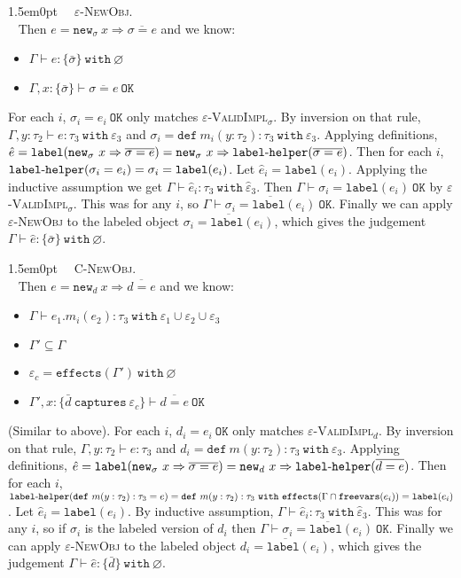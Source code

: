 \documentclass{llncs}
\newcommand{\keywadj}[1]{\mathtt{#1}}
\newcommand{\keyw}[1]{\keywadj{#1}~}
\newcommand{\hyphen}{\hbox{-}}
\newcommand{\proofcase}[2]{
	\begin{adjustwidth}{1.5em}{0pt}
		\fbox{Case.}~~#1. \\ ~#2
	\end{adjustwidth}
}
\newcommand{\type}[2]{
	#1~\keyw{with} #2
}
\newcommand{\newd}[0]{
	\keywadj{new}_d~x \Rightarrow \overline{d = e}
}
\newcommand{\newsig}[0]{
	\keywadj{new}_\sigma~x \Rightarrow \overline{\sigma = e}
}
\begin{document}
{\proofcase{\textsc{$\varepsilon$-NewObj}}{
Then $e = \newsig$ and we know:
\begin{itemize}
	\item $\Gamma \vdash e : \type{ \{ \bar \sigma \} }{\varnothing}$
	\item $\Gamma, x : \{ \bar \sigma \} \vdash \overline{ \sigma = e }~\keyw{OK}$
\end{itemize}
For each $i$, $\sigma_i = e_i~\keywadj{OK}$ only matches \textsc{$\varepsilon$-ValidImpl$_\sigma$}. By inversion on that rule, $\Gamma, y : \tau_2 \vdash e: \tau_3~\keyw{with} \varepsilon_3$ and $\sigma_i = \keyw{def} m_i(y : \tau_2) : \tau_3~\keyw{with} \varepsilon_3$. Applying definitions, $\hat e = \keywadj{label}(\newsig) = \keywadj{new}_\sigma~x \Rightarrow \keywadj{label \hyphen helper}(\overline{\sigma = e})$. Then for each $i$, 
 $\keywadj{label \hyphen helper}(\sigma_i = e _i) = \sigma_i = \keywadj{label}(e_i)$. Let $\hat e_i = \keywadj{label}(e_i)$. Applying the inductive assumption we get $\Gamma \vdash \hat e_i : \type{\tau_3}{\hat \varepsilon_3}$. Then $\Gamma \vdash \sigma_i = \keywadj{label}(e_i)~\keywadj{OK}$ by \textsc{$\varepsilon$-ValidImpl$_\sigma$}. This was for any $i$, so $\Gamma \vdash \overline{ \sigma_i = \keywadj{label}(e_i) }~\keywadj{OK}$. Finally we can apply \textsc{$\varepsilon$-NewObj} to the labeled object $\overline{ \sigma_i = \keywadj{label}(e_i) }$, which gives the judgement $\Gamma \vdash \hat e : \{ \bar \sigma \}~\keyw{with} \varnothing$.\\
}

\proofcase{\textsc{C-NewObj}}{
Then $e = \newd$ and we know:
\begin{itemize}
	\item $\Gamma \vdash e_1.m_i(e_2) : \type{\tau_3}{\varepsilon_1 \cup \varepsilon_2 \cup \varepsilon_3}$
	\item $\Gamma' \subseteq \Gamma$
	\item $\varepsilon_c = \keywadj{effects}(\Gamma')~\keyw{with} \varnothing$
	\item $\Gamma', x : \{ \bar d~\keyw{captures} \varepsilon_c \} \vdash \overline{d = e}~\keyw{OK}$
\end{itemize}
(Similar to above). For each $i$, $d_i = e_i~\keywadj{OK}$ only matches \textsc{$\varepsilon$-ValidImpl$_d$}. By inversion on that rule, $\Gamma, y : \tau_2 \vdash e: \tau_3$ and $d_i = \keyw{def} m(y : \tau_2) : \tau_3~\keyw{with} \varepsilon_3$. Applying definitions, $\hat e = \keywadj{label}(\newsig) = \keywadj{new}_d~x \Rightarrow \keywadj{label \hyphen helper}(\overline{d = e})$. Then for each $i$, $\keywadj{label \hyphen helper}(\keywadj{def}~m(y : \tau_2) : \tau_3 = e) = \keywadj{def}~m(y : \tau_2) : \tau_3~\keyw{with}  \keywadj{effects}(\Gamma \cap \keywadj{freevars}(e_i)) = \keywadj{label}(e_i)$. Let $\hat e_i = \keywadj{label}(e_i)$. By inductive assumption, $\Gamma \vdash \hat e_i : \tau_3~\keyw{with} \hat \varepsilon_3$. This was for any $i$, so if $\sigma_i$ is the labeled version of $d_i$ then $\Gamma \vdash \overline{ \sigma_i = \keywadj{label}(e_i) }~\keywadj{OK}$. Finally we can apply \textsc{$\varepsilon$-NewObj} to the labeled object $\overline{ d_i = \keywadj{label}(e_i) }$, which gives the judgement $\Gamma \vdash \hat e : \{ \bar d \}~\keyw{with} \varnothing$.
}
}
\end{document}
